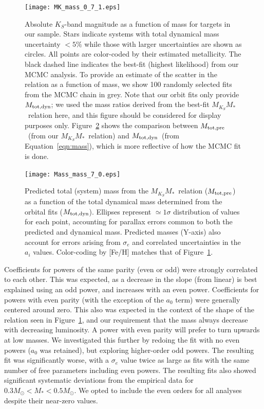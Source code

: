 \documentclass[twocolumn]{aastex62}
\newcommand{\mmk}{$M_{K_S}$\textendash$M_*$}
\newcommand{\mpred}{$M_{\rm{tot,pre}}$}
\newcommand{\mdyn}{$M_{\rm{tot,dyn}}$}
\begin{document}
\begin{figure}[htp]
\begin{center}
\texttt{[image: MK\_mass\_0\_7\_1.eps]}
\caption{Absolute $K_S$-band magnitude as a function of mass for targets in our sample. Stars indicate systems with total dynamical mass uncertainty $<5\%$ while those with larger uncertainties are shown as circles. All points are color-coded by their estimated metallicity. The black dashed line indicates the best-fit (highest likelihood) from our MCMC analysis. To provide an estimate of the scatter in the relation as a function of mass, we show 100 randomly selected fits from the MCMC chain in grey. Note that our orbit fits only provide \mdyn; we used the mass ratios derived from the best-fit \mmk\ relation here, and this figure should be considered for display purposes only. Figure~\ref{fig:m_m} shows the comparison between \mpred\ (from our \mmk\ relation) and \mdyn\ (from Equation~\ref{eqn:mass}), which is more reflective of how the MCMC fit is done. }
\label{fig:relation}
\end{center}
\end{figure}

\begin{figure}[ht]
\begin{center}
\texttt{[image: Mass\_mass\_7\_0.eps]}
\caption{Predicted total (system) mass from the \mmk\ relation (\mpred) as a function of the total dynamical mass determined from the orbital fits (\mdyn). Ellipses represent $\simeq1\sigma$ distribution of values for each point, accounting for parallax errors common to both the predicted and dynamical mass. Predicted masses (Y-axis) also account for errors arising from $\sigma_e$ and correlated uncertainties in the $a_i$ values. Color-coding by [Fe/H] matches that of Figure~\ref{fig:relation}.}
\label{fig:m_m}
\end{center}
\end{figure}


Coefficients for powers of the same parity (even or odd) were strongly correlated to each other. This was expected, as a decrease in the slope (from linear) is best explained using an odd power, and increases with an even power. Coefficients for powers with even parity (with the exception of the $a_0$ term) were generally centered around zero. This also was expected in the context of the shape of the relation seen in Figure~\ref{fig:relation}, and our requirement that the mass always decrease with decreasing luminosity. A power with even parity will prefer to turn upwards at low masses. We investigated this further by redoing the fit with no even powers ($a_0$ was retained), but exploring higher-order odd powers. The resulting fit was significantly worse, with a $\sigma_e$ value twice as large as fits with the same number of free parameters including even powers. The resulting fits also showed significant systematic deviations from the empirical data for $0.3M_\odot<M_*<0.5M_\odot$. We opted to include the even orders for all analyses despite their near-zero values. 
\end{document}
